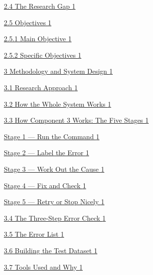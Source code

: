 \documentclass[
]{article}
\begin{document}
\protect\hyperlink{the-research-gap}{2.4 The Research Gap
\protect\hyperlink{the-research-gap}{1}}

\protect\hyperlink{objectives}{2.5 Objectives
\protect\hyperlink{objectives}{1}}

\protect\hyperlink{main-objective}{2.5.1 Main Objective
\protect\hyperlink{main-objective}{1}}

\protect\hyperlink{specific-objectives}{2.5.2 Specific Objectives
\protect\hyperlink{specific-objectives}{1}}

\protect\hyperlink{methodology-and-system-design}{3 Methodology and
System Design \protect\hyperlink{methodology-and-system-design}{1}}

\protect\hyperlink{research-approach}{3.1 Research Approach
\protect\hyperlink{research-approach}{1}}

\protect\hyperlink{how-the-whole-system-works}{3.2 How the Whole System
Works \protect\hyperlink{how-the-whole-system-works}{1}}

\protect\hyperlink{how-component-3-works-the-five-stages}{3.3 How
Component 3 Works: The Five Stages
\protect\hyperlink{how-component-3-works-the-five-stages}{1}}

\protect\hyperlink{stage-1---run-the-command}{Stage 1 --- Run the
Command \protect\hyperlink{stage-1---run-the-command}{1}}

\protect\hyperlink{stage-2---label-the-error}{Stage 2 --- Label the
Error \protect\hyperlink{stage-2---label-the-error}{1}}

\protect\hyperlink{stage-3---work-out-the-cause}{Stage 3 --- Work Out
the Cause \protect\hyperlink{stage-3---work-out-the-cause}{1}}

\protect\hyperlink{stage-4---fix-and-check}{Stage 4 --- Fix and Check
\protect\hyperlink{stage-4---fix-and-check}{1}}

\protect\hyperlink{stage-5---retry-or-stop-nicely}{Stage 5 --- Retry or
Stop Nicely \protect\hyperlink{stage-5---retry-or-stop-nicely}{1}}

\protect\hyperlink{the-three-step-error-check}{3.4 The Three-Step Error
Check \protect\hyperlink{the-three-step-error-check}{1}}

\protect\hyperlink{the-error-list}{3.5 The Error List
\protect\hyperlink{the-error-list}{1}}

\protect\hyperlink{building-the-test-dataset}{3.6 Building the Test
Dataset \protect\hyperlink{building-the-test-dataset}{1}}

\protect\hyperlink{tools-used-and-why}{3.7 Tools Used and Why
\protect\hyperlink{tools-used-and-why}{1}}
\end{document}
